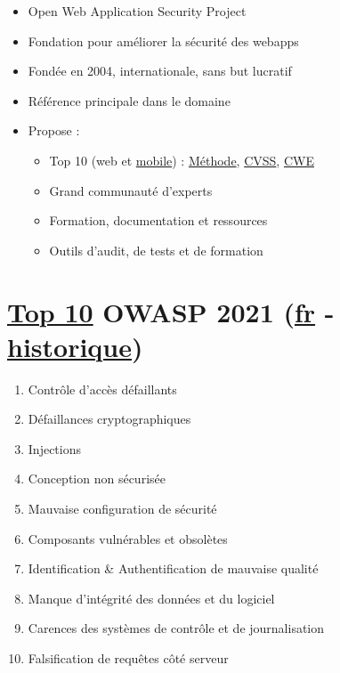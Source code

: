 \begin{itemize}
\tightlist
\item
  Open Web Application Security Project
\item
  Fondation pour améliorer la sécurité des webapps
\item
  Fondée en 2004, internationale, sans but lucratif
\item
  Référence principale dans le domaine
\item
  Propose :

  \begin{itemize}
  \tightlist
  \item
    Top 10 (web et
    \href{https://owasp.org/www-project-mobile-top-10/}{mobile}) :
    \href{https://owasp.org/Top10/\#methodology}{Méthode},
    \href{https://www.first.org/cvss/calculator/3.0}{CVSS},
    \href{https://cwe.mitre.org/top25/archive/2022/2022_cwe_top25.html}{CWE}
  \item
    Grand communauté d'experts
  \item
    Formation, documentation et ressources
  \item
    Outils d'audit, de tests et de formation
  \end{itemize}
\end{itemize}

\hypertarget{top-109-owasp-2021-fr27---historique30}{%
\section{\texorpdfstring{\href{https://www.owasp.org/index.php/Category:OWASP_Top_Ten_Project}{Top
10} OWASP 2021 (\href{https://owasp.org/Top10/fr/}{fr} -
\href{https://www.hahwul.com/cullinan/history-of-owasp-top-10/}{historique})}{Top 10 OWASP 2021 (fr - historique)}}\label{top-109-owasp-2021-fr27---historique30}}

\begin{enumerate}
\def\labelenumi{\arabic{enumi}.}
\tightlist
\item
  Contrôle d'accès défaillants
\item
  Défaillances cryptographiques
\item
  Injections
\item
  Conception non sécurisée
\item
  Mauvaise configuration de sécurité
\item
  Composants vulnérables et obsolètes
\item
  Identification \& Authentification de mauvaise qualité
\item
  Manque d'intégrité des données et du logiciel
\item
  Carences des systèmes de contrôle et de journalisation
\item
  Falsification de requêtes côté serveur
\end{enumerate}

